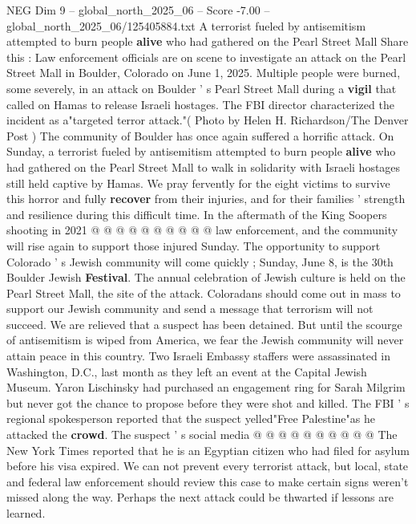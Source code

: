 \begin{textsample}{NEG Dim 9 – global\_north\_2025\_06 – Score -7.00 – global\_north\_2025\_06/125405884.txt}  \label{ex:f9_neg_097}
A terrorist fueled by antisemitism attempted to burn people \textbf{alive} who had gathered on the Pearl Street Mall Share this : Law enforcement officials are on scene to investigate an attack on the Pearl Street Mall in Boulder, Colorado on June 1, 2025.
Multiple people were burned, some severely, in an attack on Boulder ' s Pearl Street Mall during a \textbf{vigil} that called on Hamas to release Israeli hostages.
The FBI director characterized the incident as a"targeted terror attack."( Photo by Helen H.
Richardson/The Denver Post ) The community of Boulder has once again suffered a horrific attack.
On Sunday, a terrorist fueled by antisemitism attempted to burn people \textbf{alive} who had gathered on the Pearl Street Mall to walk in solidarity with Israeli hostages still held captive by Hamas.
We pray fervently for the eight victims to survive this horror and fully \textbf{recover} from their injuries, and for their families ' strength and resilience during this difficult time.
In the aftermath of the King Soopers shooting in 2021 @ @ @ @ @ @ @ @ @ @ law enforcement, and the community will rise again to support those injured Sunday.
The opportunity to support Colorado ' s Jewish community will come quickly ; Sunday, June 8, is the 30th Boulder Jewish \textbf{Festival}.
The annual celebration of Jewish culture is held on the Pearl Street Mall, the site of the attack.
Coloradans should come out in mass to support our Jewish community and send a message that terrorism will not succeed.
We are relieved that a suspect has been detained.
But until the scourge of antisemitism is wiped from America, we fear the Jewish community will never attain peace in this country.
Two Israeli Embassy staffers were assassinated in Washington, D.C., last month as they left an event at the Capital Jewish Museum.
Yaron Lischinsky had purchased an engagement ring for Sarah Milgrim but never got the chance to propose before they were shot and killed.
The FBI ' s regional spokesperson reported that the suspect yelled"Free Palestine"as he attacked the \textbf{crowd}.
The suspect ' s social media @ @ @ @ @ @ @ @ @ @ The New York Times reported that he is an Egyptian citizen who had filed for asylum before his visa expired.
We can not prevent every terrorist attack, but local, state and federal law enforcement should review this case to make certain signs weren't missed along the way.
Perhaps the next attack could be thwarted if lessons are learned.

\end{textsample}
